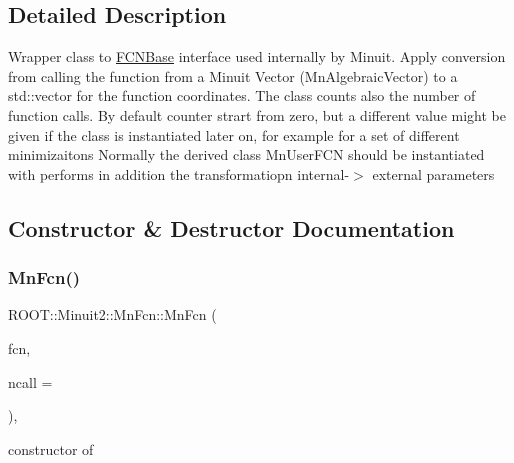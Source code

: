 \subsection{Detailed Description}
Wrapper class to \mbox{\hyperlink{classROOT_1_1Minuit2_1_1FCNBase}{F\+C\+N\+Base}} interface used internally by Minuit. Apply conversion from calling the function from a Minuit Vector (Mn\+Algebraic\+Vector) to a std\+::vector for the function coordinates. The class counts also the number of function calls. By default counter strart from zero, but a different value might be given if the class is instantiated later on, for example for a set of different minimizaitons Normally the derived class Mn\+User\+F\+CN should be instantiated with performs in addition the transformatiopn internal-\/$>$ external parameters 

\subsection{Constructor \& Destructor Documentation}
\mbox{\label{classROOT_1_1Minuit2_1_1MnFcn_a882c5c26556515b2bbe0d07f50b32f4f}} 
\subsubsection{\texorpdfstring{MnFcn()}{MnFcn()}\hspace{0.1cm}{\footnotesize\ttfamily [1/3]}}
{\footnotesize\ttfamily R\+O\+O\+T\+::\+Minuit2\+::\+Mn\+Fcn\+::\+Mn\+Fcn (\begin{DoxyParamCaption}\item[{const \mbox{\hyperlink{classROOT_1_1Minuit2_1_1FCNBase}{F\+C\+N\+Base}} \&}]{fcn,  }\item[{int}]{ncall = {} }\end{DoxyParamCaption})\hspace{0.3cm}{\ttfamily [inline]}, {\ttfamily [explicit]}}



constructor of 

\mbox{\label{classROOT_1_1Minuit2_1_1MnFcn_a5b9ed490eb8084814d0b8e4d76c61adc}} 
